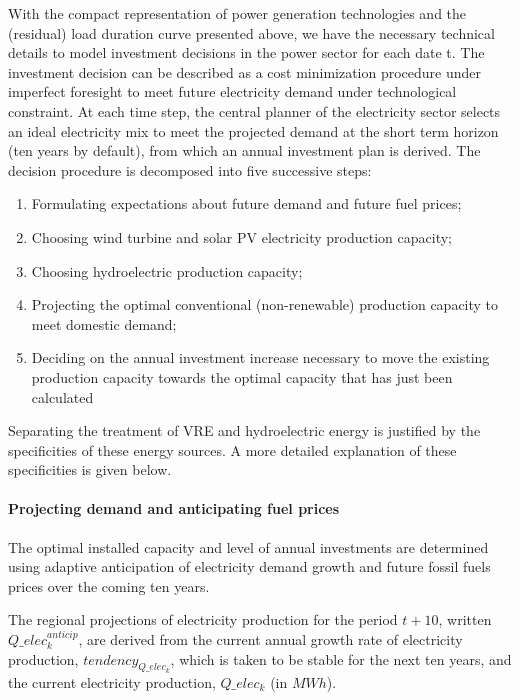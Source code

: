 {With the compact representation of power generation technologies and the (residual) load duration curve presented above, we have the necessary technical details to model investment decisions in the power sector for each date t.
The investment decision can be described as a cost minimization procedure under imperfect foresight to meet future electricity demand under technological constraint. At each time step, the central planner of the electricity sector selects an ideal electricity mix to meet the projected demand at the short term horizon (ten years by default), from which an annual investment plan is derived.
The decision procedure is decomposed into five successive steps:
\begin{enumerate}
    \item Formulating expectations about future demand and future fuel prices;
    \item Choosing  wind turbine and solar PV  electricity production capacity;
    \item Choosing hydroelectric production capacity;
    \item Projecting the optimal conventional (non-renewable) production capacity to meet domestic demand;
    \item Deciding on the annual investment increase necessary to move the existing production capacity towards the optimal capacity that has just been calculated 
\end{enumerate} 

Separating the treatment of VRE and hydroelectric energy is justified by the specificities of these energy sources. A more detailed explanation of these specificities is given below.

\paragraph{Projecting demand and anticipating fuel prices}

The optimal installed capacity and level of annual investments are determined using adaptive anticipation of electricity demand growth and  future fossil fuels prices over the coming ten years.

The regional projections of electricity production for the period $t+10$, written $Q\_elec_k^{anticip}$, are derived from the current annual growth rate of electricity production, $tendency_{Q\_elec_k}$, which is taken to be stable for the next ten years, and the current electricity production, $Q\_elec_k$ (in $MWh$).

}
